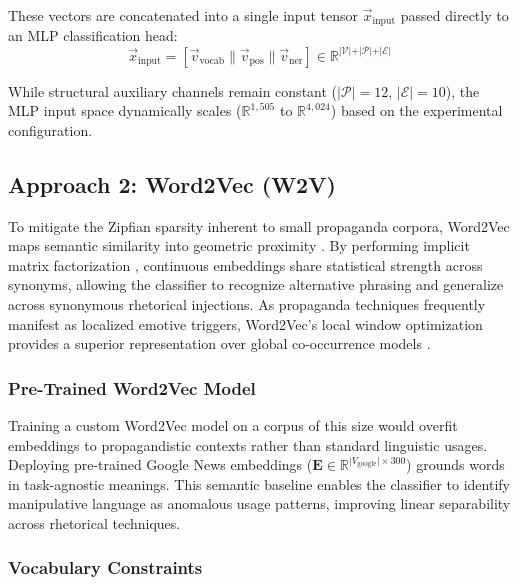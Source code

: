\documentclass[12pt, a4paper]{article}
\begin{document}
These vectors are concatenated into a single input tensor $\vec{x}_{\text{input}}$ passed directly to an MLP classification head:
\[
\vec{x}_{\text{input}} = \left[ \vec{v}_{\text{vocab}} \parallel \vec{v}_{\text{pos}} \parallel \vec{v}_{\text{ner}} \right] \in \mathbb{R}^{\vert \mathcal{V} \vert + \vert \mathcal{P} \vert + \vert \mathcal{E} \vert}
\]

While structural auxiliary channels remain constant ($\vert \mathcal{P} \vert = 12$, $\vert \mathcal{E} \vert = 10$), the MLP input space dynamically scales ($\mathbb{R}^{1,505}$ to $\mathbb{R}^{4,024}$) based on the experimental configuration.

\subsection{Approach 2: Word2Vec (W2V)}
\label{subsec:w2v_approach}

To mitigate the Zipfian sparsity inherent to small propaganda corpora, Word2Vec maps semantic similarity into geometric proximity \cite{miklov2013}. By performing implicit matrix factorization \cite{levy2014}, continuous embeddings share statistical strength across synonyms, allowing the classifier to recognize alternative phrasing and generalize across synonymous rhetorical injections. As propaganda techniques frequently manifest as localized emotive triggers, Word2Vec's local window optimization provides a superior representation over global co-occurrence models \cite{baroni2014}.

\subsubsection{Pre-Trained Word2Vec Model}
\label{subsubsec:pretrained_w2v}

Training a custom Word2Vec model on a corpus of this size would overfit embeddings to propagandistic contexts rather than standard linguistic usages. Deploying pre-trained Google News embeddings ($\mathbf{E} \in \mathbb{R}^{\vert V_{\text{google}} \vert \times 300}$) grounds words in task-agnostic meanings. This semantic baseline enables the classifier to identify manipulative language as anomalous usage patterns, improving linear separability across rhetorical techniques.

\subsubsection{Vocabulary Constraints}
\label{subsubsec:w2v_vocab_constraints}
\end{document}
